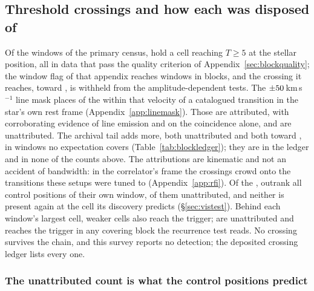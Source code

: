 \subsection{Threshold crossings and how each was disposed of}
\label{sec:technosearch}

Of the \NWindows{} windows of the primary census, \CsNCross{} hold a cell
reaching $T\geq5$ at the stellar position, all in data that pass the quality
criterion of Appendix~\ref{sec:blockquality}; the window flag of that appendix
reaches \DqNWin{} windows in \BkFlagNBlock{} blocks, and the
\BkFlagNCrossOther{} crossing it reaches, toward \BkFlagOtherStar, is withheld
from the amplitude-dependent tests. The $\pm50$\,km\,s$^{-1}$ line mask places \MkNCoinc{}
of the \CsNCrossQp{} within that velocity of a catalogued transition in the
star's own rest frame (Appendix~\ref{app:linemask}). Those \CsNAttrQp{} are attributed,
\LnAttrSupp{} with corroborating evidence of line emission and \LnAttrCoinc{}
on the coincidence alone, and \CsNUnattrQp{} are unattributed. The archival tail adds \CeNTailCrossWord{} more, both
unattributed and both toward \CeTailStar, in windows no expectation covers
(Table~\ref{tab:blockledger}); they are in the ledger and in none of the counts
above. The attributions are kinematic and not an accident of bandwidth: in
the correlator's frame the crossings crowd onto the transitions these setups
were tuned to (Appendix~\ref{app:rfi}). Of the \CsNCrossQp, \EvNLeadWord{} outrank all
\NCtrl{} control positions of their own window, \EvNRankQp{} of them
unattributed, and neither is present again at the cell its discovery predicts
(\S\ref{sec:vistest}). Behind each window's largest cell, \CkNSecondaryWord{}
weaker cells also reach the trigger; \CkNSecUnattrWord{} are unattributed and
\CkNRecurWord{} reaches the trigger in any covering block the recurrence test
reads. No crossing survives the chain, and this survey reports no detection; the
deposited crossing ledger lists every one.

\subsubsection{The unattributed count is what the control positions predict}
\label{sec:trigunif}

